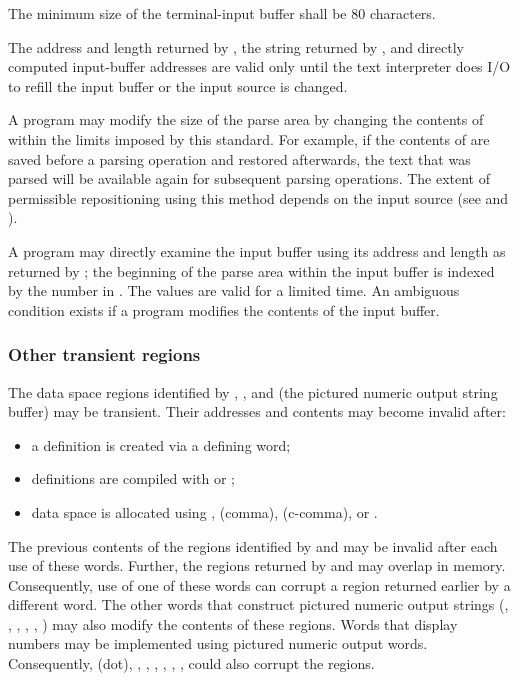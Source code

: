 The minimum size of the terminal-input buffer shall be 80
characters.

The address and length returned by , the string
returned by , and directly computed input-buffer
addresses are valid only until the text interpreter does I/O to
refill the input buffer or the input source is changed.

A program may modify the size of the parse area by changing the
contents of  within the limits imposed by this standard.
For example, if the contents of  are saved before a
parsing operation and restored afterwards, the text that was parsed
will be available again for subsequent parsing operations. The
extent of permissible repositioning using this method depends on the
input source (see 
and ).

A program may directly examine the input buffer using its address
and length as returned by ; the beginning of the parse
area within the input buffer is indexed by the number in .
The values are valid for a limited time. An ambiguous condition
exists if a program modifies the contents of the input buffer.

\subsubsection{Other transient regions} %
\label{usage:transient}

The data space regions identified by , , and
 (the pictured numeric output string buffer) may be
transient. Their addresses and contents may become invalid after:

\begin{itemize}
\item a definition is created via a defining word;
\item definitions are compiled with \word{:} or ;
\item data space is allocated using , \word{,} (comma),
	 (c-comma), or .
\end{itemize}

The previous contents of the regions identified by  and
 may be invalid after each use of these words. Further,
the regions returned by  and  may overlap in
memory. Consequently, use of one of these words can corrupt a region
returned earlier by a different word. The other words that construct
pictured numeric output strings (, , ,
, , )  may also modify
the contents of these regions. Words that display numbers may be
implemented using pictured numeric output words. Consequently, 
(dot), , , , ,
, ,  could also corrupt the
regions.


